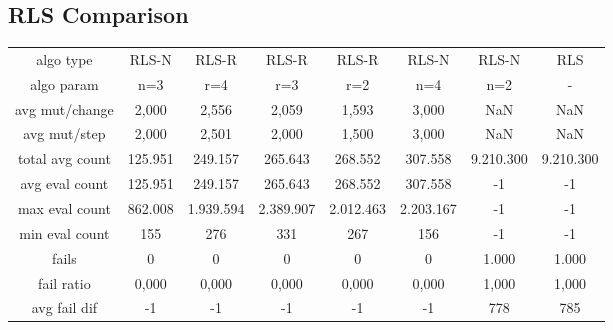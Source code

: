 \subsection{RLS Comparison}

\begin{tabular}[h]{cccccccc}
algo type&               RLS-N&        RLS-R&        RLS-R&        RLS-R&        RLS-N&        RLS-N&          RLS\\
algo param&                n=3&          r=4&          r=3&          r=2&          n=4&          n=2&            -\\
avg mut/change&          2,000&        2,556&        2,059&        1,593&        3,000&          NaN&          NaN\\
avg mut/step&            2,000&        2,501&        2,000&        1,500&        3,000&          NaN&          NaN\\
\hline
total avg count&       125.951&      249.157&      265.643&      268.552&      307.558&    9.210.300&    9.210.300\\
avg eval count&        125.951&      249.157&      265.643&      268.552&      307.558&           -1&           -1\\
max eval count&        862.008&    1.939.594&    2.389.907&    2.012.463&    2.203.167&           -1&           -1\\
min eval count&            155&          276&          331&          267&          156&           -1&           -1\\
\hline
fails&                       0&            0&            0&            0&            0&        1.000&        1.000\\
fail ratio&              0,000&        0,000&        0,000&        0,000&        0,000&        1,000&        1,000\\
avg fail dif&               -1&           -1&           -1&           -1&           -1&          778&          785\\
\end{tabular}

